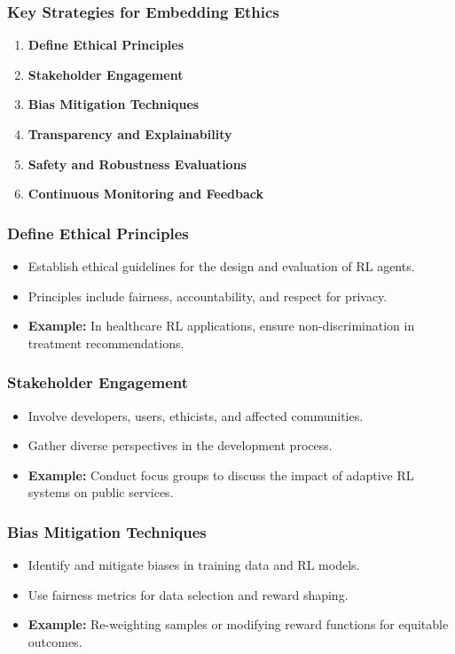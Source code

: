 \documentclass{beamer}
\begin{document}
\begin{frame}[fragile]
    \frametitle{Key Strategies for Embedding Ethics}
    \begin{enumerate}
        \item \textbf{Define Ethical Principles}
        \item \textbf{Stakeholder Engagement}
        \item \textbf{Bias Mitigation Techniques}
        \item \textbf{Transparency and Explainability}
        \item \textbf{Safety and Robustness Evaluations}
        \item \textbf{Continuous Monitoring and Feedback}
    \end{enumerate}
\end{frame}

\begin{frame}[fragile]
    \frametitle{Define Ethical Principles}
    \begin{itemize}
        \item Establish ethical guidelines for the design and evaluation of RL agents.
        \item Principles include fairness, accountability, and respect for privacy.
        \item \textbf{Example:} In healthcare RL applications, ensure non-discrimination in treatment recommendations.
    \end{itemize}
\end{frame}

\begin{frame}[fragile]
    \frametitle{Stakeholder Engagement}
    \begin{itemize}
        \item Involve developers, users, ethicists, and affected communities.
        \item Gather diverse perspectives in the development process.
        \item \textbf{Example:} Conduct focus groups to discuss the impact of adaptive RL systems on public services.
    \end{itemize}
\end{frame}

\begin{frame}[fragile]
    \frametitle{Bias Mitigation Techniques}
    \begin{itemize}
        \item Identify and mitigate biases in training data and RL models.
        \item Use fairness metrics for data selection and reward shaping.
        \item \textbf{Example:} Re-weighting samples or modifying reward functions for equitable outcomes.
    \end{itemize}
\end{frame}
\end{document}
